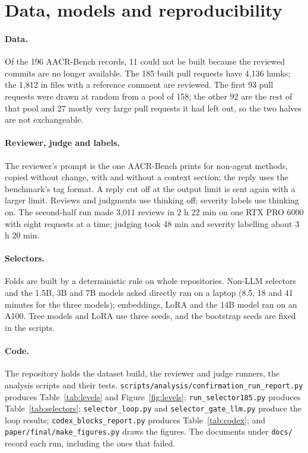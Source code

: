 \documentclass{article}
\begin{document}
\section{Data, models and reproducibility}
\label{app:setup}
\paragraph{Data.} Of the 196 AACR-Bench records, 11 could not be built because the reviewed commits are no longer available. The 185 built pull requests have 4,136 hunks; the 1,812 in files with a reference comment are reviewed. The first 93 pull requests were drawn at random from a pool of 158; the other 92 are the rest of that pool and 27 mostly very large pull requests it had left out, so the two halves are not exchangeable.

\paragraph{Reviewer, judge and labels.} The reviewer's prompt is the one AACR-Bench prints for non-agent methods, copied without change, with and without a context section; the reply uses the benchmark's tag format. A reply cut off at the output limit is sent again with a larger limit. Reviews and judgments use thinking off; severity labels use thinking on. The second-half run made 3,011 reviews in 2 h 22 min on one RTX PRO 6000 with eight requests at a time; judging took 48 min and severity labelling about 3 h 20 min.

\paragraph{Selectors.} Folds are built by a deterministic rule on whole repositories. Non-LLM selectors and the 1.5B, 3B and 7B models asked directly ran on a laptop (8.5, 18 and 41 minutes for the three models); embeddings, LoRA and the 14B model ran on an A100. Tree models and LoRA use three seeds, and the bootstrap seeds are fixed in the scripts.

\paragraph{Code.} The repository holds the dataset build, the reviewer and judge runners, the analysis scripts and their tests. \texttt{scripts/analysis/confirmation\_run\_report.py} produces Table~\ref{tab:levels} and Figure~\ref{fig:levels}; \texttt{run\_selector185.py} produces Table~\ref{tab:selectors}; \texttt{selector\_loop.py} and \texttt{selector\_gate\_llm.py} produce the loop results; \texttt{codex\_blocks\_report.py} produces Table~\ref{tab:codex}; and \texttt{paper/final/make\_figures.py} draws the figures. The documents under \texttt{docs/} record each run, including the ones that failed.
\end{document}
